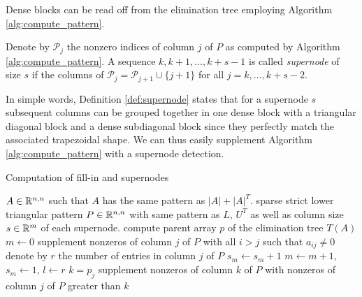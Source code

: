Dense blocks can be read off from the elimination tree employing
Algorithm \ref{alg:compute_pattern}.
\begin{definition}\label{def:supernode}
Denote by $\mathcal{P}_j$ the nonzero indices of column $j$ of $P$
as computed by Algorithm \ref{alg:compute_pattern}.
A sequence $k,k+1,\dots,k+s-1$ is called \emph{supernode} of size $s$
if the columns of $\mathcal{P}_{j}=\mathcal{P}_{j+1}\cup \{j+1\}$
for all $j=k,\dots,k+s-2$.
\end{definition}
In simple words, Definition \ref{def:supernode} states that for a supernode
$s$ subsequent columns can be grouped together in one dense block with a triangular
diagonal block and a dense subdiagonal block since they perfectly match the 
associated trapezoidal shape. We can thus easily supplement 
Algorithm \ref{alg:compute_pattern} with a supernode detection.
\begin{programcode}{Computation of fill-in and supernodes}\label{alg:compute_supernode}
\begin{algorithmic}[1]
  \Require $A\in\mathbb{R}^{n,n}$ such that $A$ has the same pattern as $|A|+|A|^T$.
  \Ensure sparse strict lower triangular pattern $P\in\mathbb{R}^{n,n}$ with
  same pattern as $L$, $U^T$ as well as column size $s\in\mathbb{R}^m$ of each supernode.
  \State compute parent array $p$ of the elimination tree $T(A)$
  \State $m\leftarrow0$ 
      \State supplement nonzeros of column $j$ of $P$ with all $i>j$ such that $a_{ij}\not=0$ 
      \State denote by $r$ the number of entries in column $j$ of $P$
         \State $s_m\leftarrow s_m+1$ 
      \Else
         \State $m\leftarrow m+1$, $s_m\leftarrow 1$, $l\leftarrow r$ 
      \EndIf
      \State $k=p_j$
         \State supplement nonzeros of column $k$ of $P$ with nonzeros of column $j$ of $P$ greater than $k$
      \EndIf   
  \EndFor
\end{algorithmic}
\end{programcode}





